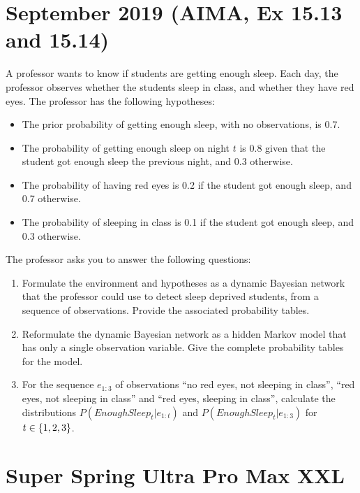 \documentclass[11pt, a4paper]{article}
\begin{document}
\newpage

\section{September 2019 (AIMA, Ex 15.13 and 15.14)}

A professor wants to know if students are getting enough sleep. Each day, the professor observes whether the students sleep in class, and whether they have red eyes. The professor has the following hypotheses:
\begin{itemize}
    \item The prior probability of getting enough sleep, with no observations, is \num{0.7}.
    \item The probability of getting enough sleep on night $t$ is \num{0.8} given that the student got enough sleep the previous night, and \num{0.3} otherwise.
    \item The probability of having red eyes is \num{0.2} if the student got enough sleep, and \num{0.7} otherwise.
    \item The probability of sleeping in class is \num{0.1} if the student got enough sleep, and \num{0.3} otherwise.
\end{itemize}
The professor asks you to answer the following questions:

\begin{enumerate}
    \item Formulate the environment and hypotheses as a dynamic Bayesian network that the professor could use to detect sleep deprived students, from a sequence of observations. Provide the associated probability tables.

    \item Reformulate the dynamic Bayesian network as a hidden Markov model that has only a single observation variable. Give the complete probability tables for the model.

    \item For the sequence $e_{1:3}$ of observations \enquote{no red eyes, not sleeping in class}, \enquote{red eyes, not sleeping in class} and
    \enquote{red eyes, sleeping in class}, calculate the distributions $P(EnoughSleep_t | e_{1:t})$ and $P(EnoughSleep_t | e_{1:3})$ for $t \in \{1, 2, 3\}$.
\end{enumerate}

\newpage

\section{Super Spring Ultra Pro Max XXL}
\end{document}
